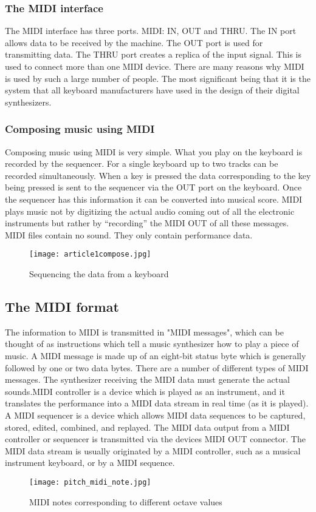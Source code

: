 \documentclass[12pt,a4paper]{article}
\begin{document}
\subsubsection{The MIDI interface} The MIDI interface has three ports. MIDI: IN, OUT and THRU. The IN port allows data to be received by the machine. The OUT port is used for transmitting data. The THRU port creates a replica of the input signal. This is used to connect more than one MIDI device. There are many reasons why MIDI is used by such a large number of people. The most significant being that it is the system that all keyboard manufacturers have used in the design of their digital synthesizers.

\subsubsection{Composing music using MIDI} Composing music using MIDI is very simple. What you play on the keyboard is recorded by the sequencer. For a single keyboard up to two tracks can be recorded simultaneously. When a key is pressed the data corresponding to the key being pressed is sent to the sequencer via the OUT port on the keyboard. Once the sequencer has this information it can be converted into musical score. MIDI plays music not by digitizing the actual audio coming out of all the electronic instruments but rather by “recording” the MIDI OUT of all these messages. MIDI files contain no sound. They only contain performance data.

\begin{figure}[ht]
\centering
\texttt{[image: article1compose.jpg]}
\caption{Sequencing the data from a keyboard}
\label{fig:beta}
\end{figure}


\subsection{The MIDI format}

The information to MIDI is transmitted in "MIDI messages", which can be thought of as instructions which tell a music synthesizer how to play a piece of music. A MIDI message is made up of an eight-bit status byte which is generally followed by one or two data bytes. There are a number of different types of MIDI messages. The synthesizer receiving the MIDI data must generate the actual sounds.MIDI controller is a device which is played as an instrument, and it translates the performance into a MIDI data stream in real time (as it is played). A MIDI sequencer is a device which allows MIDI data sequences to be captured, stored, edited, combined, and replayed. The MIDI data output from a MIDI controller or sequencer is transmitted via the devices MIDI OUT connector. The MIDI data stream is usually originated by a MIDI controller, such as a musical instrument keyboard, or by a MIDI sequence.
\begin{figure}[!htb]
\centering
\texttt{[image: pitch\_midi\_note.jpg]}
\caption{MIDI notes corresponding to different octave values}
\label{pitch_note}
\end{figure}
\end{document}
